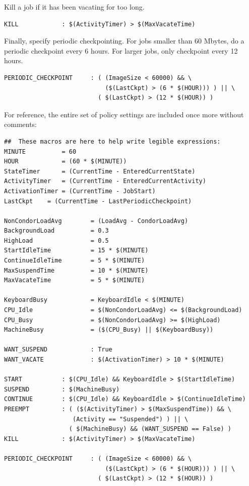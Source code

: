 Kill a job if it has been vacating for too long.
\begin{verbatim}
KILL            : $(ActivityTimer) > $(MaxVacateTime)
\end{verbatim}

Finally, specify periodic checkpointing.  
For jobs smaller than 60 Mbytes, do a periodic checkpoint every 6 hours.  
For larger jobs, only checkpoint every 12 hours.
\begin{verbatim}
PERIODIC_CHECKPOINT     : ( (ImageSize < 60000) && \
                            ($(LastCkpt) > (6 * $(HOUR))) ) || \ 
                          ( $(LastCkpt) > (12 * $(HOUR)) )
\end{verbatim}

For reference, the entire set of policy settings are included
once more without comments:

\begin{verbatim}
##  These macros are here to help write legible expressions:
MINUTE          = 60
HOUR            = (60 * $(MINUTE))
StateTimer      = (CurrentTime - EnteredCurrentState)
ActivityTimer   = (CurrentTime - EnteredCurrentActivity)
ActivationTimer = (CurrentTime - JobStart)
LastCkpt	= (CurrentTime - LastPeriodicCheckpoint)

NonCondorLoadAvg        = (LoadAvg - CondorLoadAvg)
BackgroundLoad          = 0.3
HighLoad                = 0.5
StartIdleTime           = 15 * $(MINUTE)
ContinueIdleTime        = 5 * $(MINUTE)
MaxSuspendTime          = 10 * $(MINUTE)
MaxVacateTime           = 5 * $(MINUTE)

KeyboardBusy            = KeyboardIdle < $(MINUTE)
CPU_Idle                = $(NonCondorLoadAvg) <= $(BackgroundLoad)
CPU_Busy                = $(NonCondorLoadAvg) >= $(HighLoad)
MachineBusy             = ($(CPU_Busy) || $(KeyboardBusy))

WANT_SUSPEND            : True
WANT_VACATE             : $(ActivationTimer) > 10 * $(MINUTE)

START           : $(CPU_Idle) && KeyboardIdle > $(StartIdleTime)
SUSPEND         : $(MachineBusy)
CONTINUE        : $(CPU_Idle) && KeyboardIdle > $(ContinueIdleTime)
PREEMPT	        : ( ($(ActivityTimer) > $(MaxSuspendTime)) && \
                   (Activity == "Suspended") ) || \
                  ( $(MachineBusy) && (WANT_SUSPEND == False) )
KILL            : $(ActivityTimer) > $(MaxVacateTime)

PERIODIC_CHECKPOINT     : ( (ImageSize < 60000) && \
                            ($(LastCkpt) > (6 * $(HOUR))) ) || \ 
                          ( $(LastCkpt) > (12 * $(HOUR)) )
\end{verbatim}

